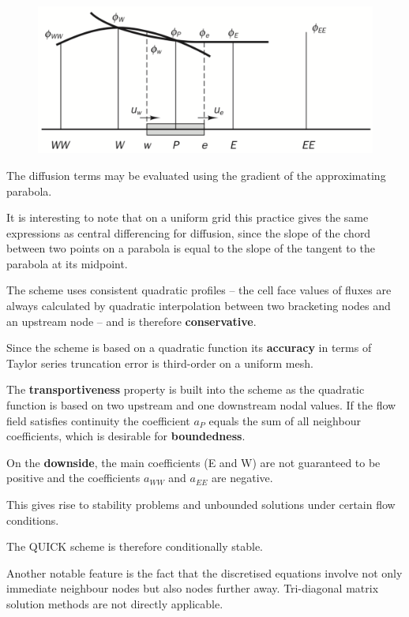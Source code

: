 \documentclass[a4paper, 15pt]{article}
\begin{document}
\begin{figure}[H]
	\centering
	\includegraphics[width=0.5\linewidth]{fig/screenshot019}
	\label{fig:screenshot019}
\end{figure}

The diffusion terms may be evaluated using the gradient of the approximating parabola.

It is interesting to note that on a uniform grid this practice gives the same expressions as central
differencing for diffusion, since the slope of the chord between two points on a parabola is equal
to the slope of the tangent to the parabola at its midpoint. \newline 

The scheme uses consistent quadratic profiles – the cell face values of fluxes are always
calculated by quadratic interpolation between two bracketing nodes and an upstream node –
and is therefore \textbf{conservative}. \newline 

Since the scheme is based on a quadratic function its \textbf{accuracy} in terms of Taylor series
truncation error is third-order on a uniform mesh. \newline 

The \textbf{transportiveness} property is built into the scheme as the quadratic function is based on two
upstream and one downstream nodal values. If the flow field satisfies continuity the coefficient
$a_P$ equals the sum of all neighbour coefficients, which is desirable for \textbf{boundedness}.\newline

On the \textbf{downside}, the main coefficients (E and W) are not guaranteed to be positive and the
coefficients $a_{WW}$ and $a_{EE}$ are negative.

This gives rise to stability problems and unbounded solutions under certain flow conditions.

The QUICK scheme is therefore conditionally stable. \newline 

Another notable feature is the fact that the discretised equations involve not only immediate
neighbour nodes but also nodes further away. Tri-diagonal matrix solution methods are not
directly applicable. \newline 
\end{document}
